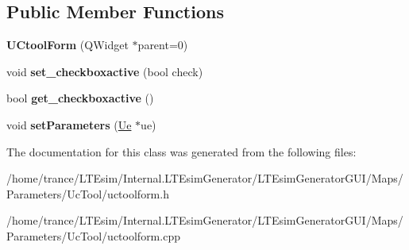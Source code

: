 \subsection*{Public Member Functions}
\begin{DoxyCompactItemize}
\item 
{\bfseries U\+Ctool\+Form} (Q\+Widget $\ast$parent=0)\hypertarget{class_u_ctool_form_a774459e5c93afdee73673a2ea3f8d450}{}\label{class_u_ctool_form_a774459e5c93afdee73673a2ea3f8d450}

\item 
void {\bfseries set\+\_\+checkboxactive} (bool check)\hypertarget{class_u_ctool_form_ac086292fae3e63dded7eb4281d3d2b47}{}\label{class_u_ctool_form_ac086292fae3e63dded7eb4281d3d2b47}

\item 
bool {\bfseries get\+\_\+checkboxactive} ()\hypertarget{class_u_ctool_form_ad4d76b451cb03c1e5f8a33886f9df887}{}\label{class_u_ctool_form_ad4d76b451cb03c1e5f8a33886f9df887}

\item 
void {\bfseries set\+Parameters} (\hyperlink{class_ue}{Ue} $\ast$ue)\hypertarget{class_u_ctool_form_a0d31a42f1ae073a5d9c0480a391375c3}{}\label{class_u_ctool_form_a0d31a42f1ae073a5d9c0480a391375c3}

\end{DoxyCompactItemize}


The documentation for this class was generated from the following files\+:\begin{DoxyCompactItemize}
\item 
/home/trance/\+L\+T\+Esim/\+Internal.\+L\+T\+Esim\+Generator/\+L\+T\+Esim\+Generator\+G\+U\+I/\+Maps/\+Parameters/\+Uc\+Tool/uctoolform.\+h\item 
/home/trance/\+L\+T\+Esim/\+Internal.\+L\+T\+Esim\+Generator/\+L\+T\+Esim\+Generator\+G\+U\+I/\+Maps/\+Parameters/\+Uc\+Tool/uctoolform.\+cpp\end{DoxyCompactItemize}
